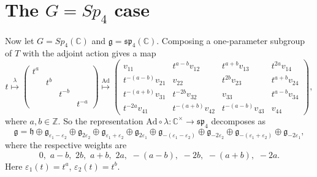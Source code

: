 \documentclass[12pt]{amsart}
\newcommand{\C}{\mathbb{C}}
\newcommand{\g}{\mathfrak{g}}
\newcommand{\h}{\mathfrak{h}}
\theoremstyle{remark}
\theoremstyle{remark}
\theoremstyle{remark}
\begin{document}
\section*{The $G = Sp_4$ case}
Now let $G = Sp_4(\C)$ and $\mathfrak{g} = \mathfrak{sp}_4(\C)$.
Composing a one-parameter subgroup of $T$ with the adjoint action gives a map
$$t 
\overset{\lambda}{\mapsto} 
\begin{pmatrix} 
	t^a & & & \\ 
	& t^b & & \\ 
	& & t^{-b} & \\
	& & & t^{-a} 
\end{pmatrix}
\overset{\mathrm{Ad}}{\mapsto} 
\begin{pmatrix} 
	v_{11} & t^{a-b} v_{12} & t^{a+b} v_{13} & t^{2a} v_{14} \\ 
	t^{-(a-b)} v_{21} & v_{22} & t^{2b} v_{23} & t^{a+b} v_{24} \\ 
	t^{-(a+b)} v_{31} & t^{-2b} v_{32} & v_{33} & t^{a-b} v_{34} \\
	t^{-2a} v_{41} & t^{-(a+b)} v_{42} & t^{-(a-b)} v_{43} & v_{44}
\end{pmatrix},$$
where $a, b \in \mathbb{Z}$.
So the representation $\mathrm{Ad} \circ \lambda : \C^\times \to \mathfrak{sp}_4$ decomposes as
$$
\mathfrak{g} 
= \h \oplus \g_{\varepsilon_1-\varepsilon_2} \oplus \g_{2 \varepsilon_2} \oplus \g_{\varepsilon_1+\varepsilon_2} \oplus \g_{2\varepsilon_1} 
\oplus \g_{-(\varepsilon_1-\varepsilon_2)} \oplus \g_{-2 \varepsilon_2} \oplus \g_{-(\varepsilon_1+\varepsilon_2)} \oplus \g_{-2\varepsilon_1}, 
$$
where the respective weights are
$$0, \,\, a-b, \,\, 2b, \,\, a+b, \,\, 2a, \,\, -(a-b), \,\, -2b, \,\, -(a+b), \,\, -2a.$$
Here $\varepsilon_1(t) = t^{a}$, $\varepsilon_2(t) = t^{b}$.
\end{document}
